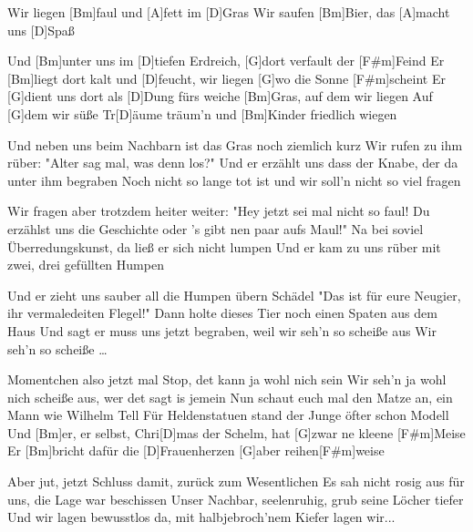 

\begin{guitar}
	Wir liegen [Bm]faul und [A]fett im [D]Gras
	Wir saufen [Bm]Bier, das [A]macht uns [D]Spaß
	
	Und [Bm]unter uns im [D]tiefen Erdreich, [G]dort verfault der [F#m]Feind
	Er [Bm]liegt dort kalt und [D]feucht, wir liegen [G]wo die Sonne [F#m]scheint
	Er [G]dient uns dort als [D]Dung fürs weiche [Bm]Gras, auf dem wir liegen
	Auf [G]dem wir süße Tr[D]{ä}ume träum'n und [Bm]Kinder friedlich wiegen
	
	 
	
	Und neben uns beim Nachbarn ist das Gras noch ziemlich kurz
	Wir rufen zu ihm rüber: "Alter sag mal, was denn los?"
	Und er erzählt uns dass der Knabe, der da unter ihm begraben
	Noch nicht so lange tot ist und wir soll'n nicht so viel fragen
	
	Wir fragen aber trotzdem heiter weiter: "Hey jetzt sei mal nicht so faul!
	Du erzählst uns die Geschichte oder 's gibt nen paar aufs Maul!"
	Na bei soviel Überredungskunst, da ließ er sich nicht lumpen
	Und er kam zu uns rüber mit zwei, drei gefüllten Humpen
	
	 
	
	Und er zieht uns sauber all die Humpen übern Schädel
	"Das ist für eure Neugier, ihr vermaledeiten Flegel!"
	Dann holte dieses Tier noch einen Spaten aus dem Haus
	Und sagt er muss uns jetzt begraben, weil wir seh'n so scheiße aus
	Wir seh'n so scheiße …
	
	Momentchen also jetzt mal Stop, det kann ja wohl nich sein
	Wir seh'n ja wohl nich scheiße aus, wer det sagt is jemein
	Nun schaut euch mal den Matze an, ein Mann wie Wilhelm Tell
	Für Heldenstatuen stand der Junge öfter schon Modell
	Und [Bm]er, er selbst, Chri[D]mas der Schelm, hat [G]zwar ne kleene [F#m]Meise
	Er [Bm]bricht dafür die [D]Frauenherzen [G]aber reihen[F#m]weise
	
	Aber jut, jetzt Schluss damit, zurück zum Wesentlichen
	Es sah nicht rosig aus für uns, die Lage war beschissen
	Unser Nachbar, seelenruhig, grub seine Löcher tiefer
	Und wir lagen bewusstlos da, mit halbjebroch'nem Kiefer lagen wir...
	

\end{guitar}
